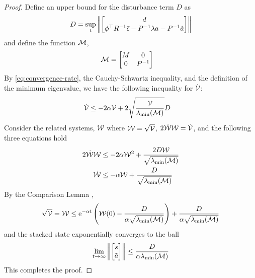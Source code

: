\begin{proof}
Define an upper bound for the disturbance term $D$ as
\begin{align}
    D = \sup_t \left\|
        \begin{bmatrix}
             d \\
            \phi^\top R^{-1} \bar{\epsilon} - P^{-1} \lambda  a - P^{-1} \dot{ a}
        \end{bmatrix}
        \right\|
\end{align}
and define the function $\mathcal{M}$,
\begin{align}
    \mathcal{M} &= 
        \begin{bmatrix}
            M & 0 \\
            0 & P^{-1}
        \end{bmatrix}
\end{align}
By \cref{eq:convergence-rate}, the Cauchy-Schwartz inequality, and the definition of the minimum eigenvalue, we have the following inequality for $\dot{\mathcal{V}}$:
\begin{align}
    \dot{\mathcal{V}} &\leq 
        - 2 \alpha \mathcal{V}
        + 2 \sqrt{\frac{\mathcal{V}}{\lambda_\text{\normalfont{min}}(\mathcal{M})}} D
\end{align}
Consider the related systems, $\mathcal{W}$ where $\mathcal{W} = \sqrt{\mathcal{V}}$, $2\dot{\mathcal{W}} \mathcal{W} = \dot{\mathcal{V}}$, and the following three equations hold
\begin{align}
    2\dot{\mathcal{W}}\mathcal{W} &\leq - 2 \alpha \mathcal{W}^2 +  \frac{2 D \mathcal{W}}{\sqrt{\lambda_\text{\normalfont{min}}(\mathcal{M})}}
    \\
    \dot{\mathcal{W}} &\leq - \alpha \mathcal{W} +  \frac{D}{\sqrt{\lambda_\text{\normalfont{min}}(\mathcal{M})}}
\end{align}
By the Comparison Lemma \cite{khalil_nonlinear_2002},
\begin{align}
    \sqrt{\mathcal{V}} = \mathcal{W} \leq \mathrm{e}^{-\alpha t} \left(\mathcal{W}(0) - \frac{D}{\alpha \sqrt{\lambda_\text{\normalfont{min}}(\mathcal{M})}} \right) + \frac{D}{\alpha \sqrt{\lambda_\text{\normalfont{min}}(\mathcal{M})}}
\end{align}
and the stacked state exponentially converges to the ball
\begin{align}
    \lim_{t\rightarrow\infty}\left\| \begin{bmatrix}  s \\ \tilde{ a} \end{bmatrix} \right\| \leq \frac{D}{\alpha \lambda_\text{\normalfont{min}}(\mathcal{M})} 
\end{align}
This completes the proof.
\end{proof}

